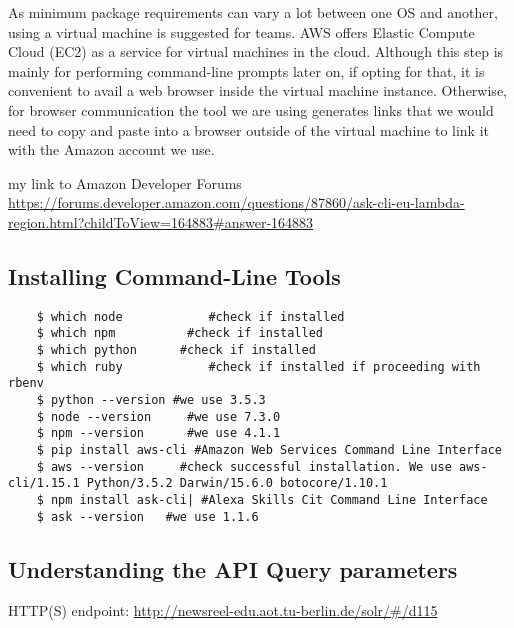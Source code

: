 As minimum package requirements can vary a lot between one OS and another, using a virtual machine is suggested for teams. AWS offers Elastic Compute Cloud (EC2) as a service for virtual machines in the cloud. Although this step is mainly for performing command-line prompts later on, if opting for that, it is convenient to avail a web browser inside the virtual machine instance. Otherwise, for browser communication the tool we are using generates links that we would need to copy and paste into a browser outside of the virtual machine to link it with the Amazon account we use.


my link to Amazon Developer Forums
\url{https://forums.developer.amazon.com/questions/87860/ask-cli-eu-lambda-region.html?childToView=164883#answer-164883}



\subsection*{Installing Command-Line Tools}

\begin{verbatim}
	$ which node			#check if installed
	$ which npm			 #check if installed
	$ which python		#check if installed
	$ which ruby			#check if installed if proceeding with rbenv
	$ python --version #we use 3.5.3
	$ node --version	 #we use 7.3.0
	$ npm --version 	 #we use 4.1.1
	$ pip install aws-cli #Amazon Web Services Command Line Interface
	$ aws --version		#check successful installation. We use aws-cli/1.15.1 Python/3.5.2 Darwin/15.6.0 botocore/1.10.1
	$ npm install ask-cli| #Alexa Skills Cit Command Line Interface
	$ ask --version	  #we use 1.1.6
\end{verbatim}








\subsection*{Understanding the API Query parameters}
HTTP(S) endpoint:
\url{http://newsreel-edu.aot.tu-berlin.de/solr/#/d115}

